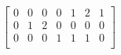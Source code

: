 \documentclass{article}
\begin{document}
 $
\left[
\begin{array}{c|c|c|c|c|c|c}
0 & 0 & 0 & 0 & 1 & 2 & 1 \\
0 & 1 & 2 & 0 & 0 & 0 & 0 \\
0 & 0 & 0 & 1 & 1 & 1 & 0 \\
\end{array}
\right] $
\end{document}
